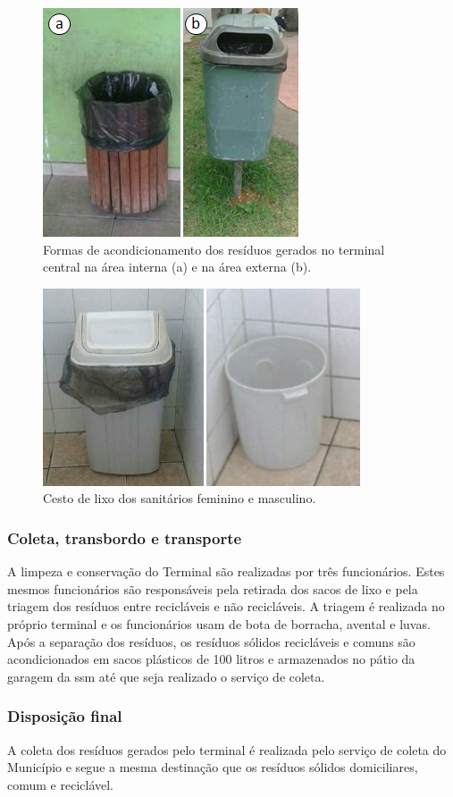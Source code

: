 \begin{figure}
	\centering
	\includegraphics[width=0.4\linewidth]{produtos/prodtres/image087}
	\caption{Formas de acondicionamento dos resíduos gerados no terminal central na área interna (a) e na área externa (b).}
	\label{fig:image087}
\end{figure}


\begin{figure}
	\centering
	\includegraphics[width=0.5\linewidth]{produtos/prodtres/image088}
	\caption{Cesto de lixo dos sanitários feminino e masculino.}
	\label{fig:image088}
\end{figure}


\subsubsection{Coleta, transbordo e transporte}
A limpeza e conservação do Terminal são realizadas por três funcionários. Estes mesmos funcionários são responsáveis pela retirada dos sacos de lixo e pela triagem dos resíduos entre recicláveis e não recicláveis. A triagem é realizada no próprio terminal e os funcionários usam de bota de borracha, avental e luvas. Após a separação dos resíduos, os resíduos sólidos recicláveis e comuns são acondicionados em sacos plásticos de 100 litros e armazenados no pátio da garagem da \gls{ssm} até que seja realizado o serviço de coleta.

\subsubsection{Disposição final}
A coleta dos resíduos gerados pelo terminal é realizada pelo serviço de coleta do Município e segue a mesma destinação que os resíduos sólidos domiciliares, comum e reciclável. 

